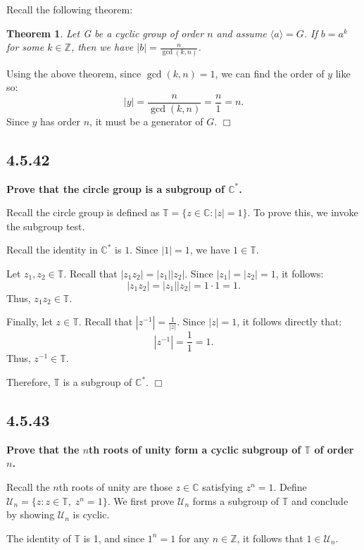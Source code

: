 \documentclass[11pt, a4paper]{article}
\newtheorem{theorem}{Theorem}
\begin{document}
Recall the following theorem:
\begin{theorem}
  Let G be a cyclic group of order $n$ and assume $\langle a \rangle = G$. If $b = a^k$ for some $k \in \mathbb{Z}$, then we have $|b| = \frac{n}{\gcd(k, n)}$.
\end{theorem}

Using the above theorem, since $\gcd(k, n) = 1$, we can find the order of $y$ like so:
\[
  |y| = \frac{n}{\gcd(k, n)} = \frac{n}{1} = n.
\]
Since $y$ has order $n$, it must be a generator of $G$. $\Box$

\subsection{4.5.42}
\textbf{Prove that the circle group is a subgroup of $\mathbb{C}^{*}$.}

Recall the circle group is defined as $\mathbb{T} = \{z \in \mathbb{C} : |z| = 1\}$. To prove this, we invoke the subgroup test.

Recall the identity in $\mathbb{C}^{*}$ is $1$. Since $|1| = 1$, we have $1 \in \mathbb{T}$.

Let $z_1, z_2 \in \mathbb{T}$. Recall that $|z_1 z_2| = |z_1| |z_2|$. Since $|z_1| = |z_2| = 1$, it follows:
\[
  |z_1 z_2| = |z_1| |z_2| = 1 \cdot 1 = 1.
\]
Thus, $z_1 z_2 \in \mathbb{T}$. 

Finally, let $z \in \mathbb{T}$. Recall that $|z^{-1}| = \frac{1}{|z|}$. Since $|z| = 1$, it follows directly that:
\[
  |z^{-1}| = \frac{1}{1} = 1.
\]
Thus, $z^{-1} \in \mathbb{T}$.

Therefore, $\mathbb{T}$ is a subgroup of $\mathbb{C}^{*}$. $\Box$

\newpage 

\subsection{4.5.43}
\textbf{Prove that the $n$th roots of unity form a cyclic subgroup of $\mathbb{T}$ of order $n$.}

Recall the $n$th roots of unity are those $z \in \mathbb{C}$ satisfying $z^n = 1$. Define $\mathcal{U}_{n} = \{z : z \in \mathbb{T}, \; z^n = 1\}$. We first prove $\mathcal{U}_{n}$ forms a subgroup of $\mathbb{T}$ and conclude by showing $\mathcal{U}_{n}$ is cyclic.

The identity of $\mathbb{T}$ is 1, and since $1^n = 1$ for any $n \in \mathbb{Z}$, it follows that $1 \in \mathcal{U}_{n}$.
\end{document}
